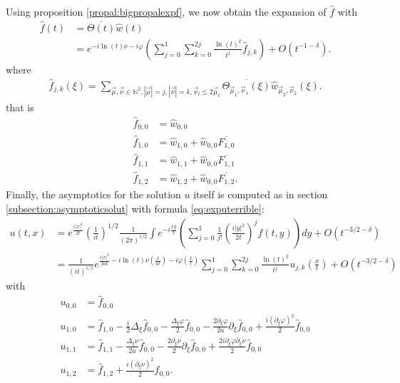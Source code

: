 \documentclass[a4paper, 15pt]{article}
\numberwithin{equation}{section}
\begin{document}
Using proposition \ref{propal:bigpropalexpf}, we now obtain the expansion of $\hat{f}$ with 
\begin{align*}
\hat{f}(t)&=\overline{\Theta(t)}\hat{w}(t)\\
&=e^{-i\ln(t)\nu-i\varphi}\left(\sum_{j=0}^1\sum_{k=0}^{2j}\frac{\ln(t)^{k}}{t^{j}}\hat{f}_{j,k}\right)+O(t^{-1-\delta}).
\end{align*}
where
\begin{align}
\hat{f}_{j,k}(\xi)=\sum_{\overrightarrow{\mu},\overrightarrow{\nu}\in\mathbb{N}^2,|\overrightarrow{\mu}|=j,|\overrightarrow{\nu}|=k,\overrightarrow{\nu}_l\leq 2\overrightarrow{\mu}_l}\overline{\Theta_{\overrightarrow{\mu}_1,\overrightarrow{\nu}_1}(\xi)}\hat{w}_{\overrightarrow{\mu}_2,\overrightarrow{\nu}_2}(\xi).
\end{align}
that is 
\begin{align*}
\hat{f}_{0,0}&=\hat{w}_{0,0}\\
\hat{f}_{1,0}&=\hat{w}_{1,0}+\hat{w}_{0,0}\overline{F_{1,0}}\\
\hat{f}_{1,1}&=\hat{w}_{1,1}+\hat{w}_{0,0}\overline{F_{1,1}}\\
\hat{f}_{1,2}&=\hat{w}_{1,2}+\hat{w}_{0,0}\overline{F_{1,2}}.
\end{align*}
Finally,  the asymptotics for the solution $u$ itself is computed as in section \ref{subsection:asymptoticsolut} with formula \eqref{eq:exputerrible}:
\begin{align*}
u(t,x)&=e^{\frac{i|x|^2}{2t}}\left(\frac{1 }{it}\right)^{1/2}\frac{1}{(2\pi)^{1/2}}\int e^{-i\frac{xy}{t}}(\sum_{j=0}^{1}\frac{1}{j!}\left(\frac{i|y|^2}{2t}\right)^jf(t,y))dy+O(t^{-3/2-\delta})\\
&=\frac{1 }{(it)^{1/2}}e^{\frac{i|x|^2}{2at}-i\ln(t)\nu\left(\frac{x}{at}\right)-i\varphi\left(\frac{x}{t}\right)}\sum_{j=0}^{1}\sum_{k=0}^{2j}\frac{\ln(t)^k}{t^{j}}u_{j,k}\left(\frac{x}{t}\right)+O(t^{-3/2-\delta})
\end{align*}
with
\begin{align*}
u_{0,0}&=\hat{f}_{0,0}\\
u_{1,0}&=\hat{f}_{1,0}-\frac{i}{2}\Delta_\xi\hat{f}_{0,0}-\frac{\Delta_\xi\varphi}{2}\hat{f}_{0,0}-\frac{2\partial_\xi\varphi}{2a}\partial_\xi\hat{f}_{0,0}+\frac{i(\partial_\xi\varphi)^2}{2}\hat{f}_{0,0}\\
u_{1,1}&=\hat{f}_{1,1}-\frac{\Delta_\xi\nu}{2a}\hat{f}_{0,0}-\frac{2\partial_\xi\nu}{2}\partial_\xi\hat{f}_{0,0}+\frac{2i\partial_\xi\varphi\partial_\xi\nu}{2}\hat{f}_{0,0}\\
u_{1,2}&=\hat{f}_{1,2}+\frac{i(\partial_\xi\nu)^2}{2}\hat{f}_{0,0}.\\
\end{align*}
\end{document}

